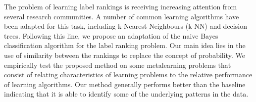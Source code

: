 The problem of learning label rankings is receiving increasing attention from several research communities. A number of common learning algorithms have been adapted for this task, including k-Nearest Neighbours (k-NN) and decision trees. Following this line, we propose an adaptation of the naive Bayes classification algorithm for the label ranking problem. Our main idea lies in the use of similarity between the rankings to replace the concept of probability. We empirically test the proposed method on some metalearning problems that consist of relating characteristics of learning problems to the relative performance of learning algorithms. Our method generally performs better than the baseline indicating that it is able to identify some of the underlying patterns in the data.
